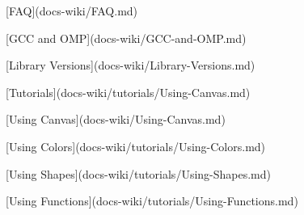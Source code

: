 
\begin{DoxyItemize}
\item \mbox{[}\-F\-A\-Q\mbox{]}(docs-\/wiki/\-F\-A\-Q.\-md)
\item \mbox{[}\-G\-C\-C and \-O\-M\-P\mbox{]}(docs-\/wiki/\-G\-C\-C-\/and-\/\-O\-M\-P.\-md)
\item \mbox{[}\-Library \-Versions\mbox{]}(docs-\/wiki/\-Library-\/\-Versions.\-md)
\item \mbox{[}\-Tutorials\mbox{]}(docs-\/wiki/tutorials/\-Using-\/\-Canvas.\-md)
\begin{DoxyItemize}
\item \mbox{[}\-Using \-Canvas\mbox{]}(docs-\/wiki/\-Using-\/\-Canvas.\-md)
\item \mbox{[}\-Using \-Colors\mbox{]}(docs-\/wiki/tutorials/\-Using-\/\-Colors.\-md)
\item \mbox{[}\-Using \-Shapes\mbox{]}(docs-\/wiki/tutorials/\-Using-\/\-Shapes.\-md)
\item \mbox{[}\-Using \-Functions\mbox{]}(docs-\/wiki/tutorials/\-Using-\/\-Functions.\-md)
\end{DoxyItemize}
\end{DoxyItemize}
